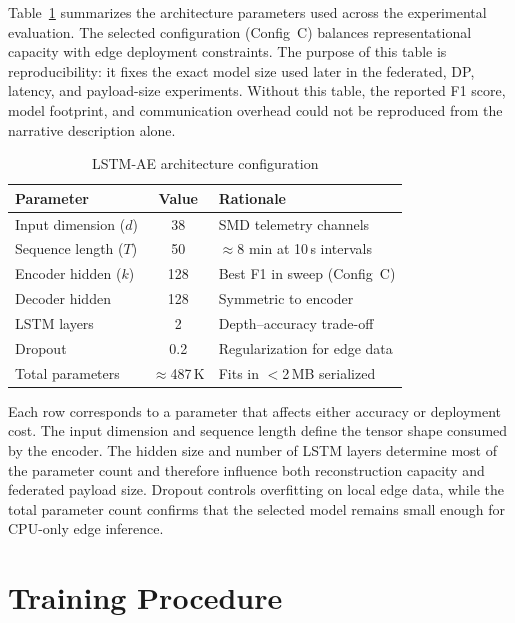 Table~\ref{tab:model_config} summarizes the architecture parameters used across
the experimental evaluation. The selected configuration (Config~C) balances
representational capacity with edge deployment constraints. The purpose of this
table is reproducibility: it fixes the exact model size used later in the
federated, DP, latency, and payload-size experiments. Without this table, the
reported F1 score, model footprint, and communication overhead could not be
reproduced from the narrative description alone.

\begin{table}[H]
    \centering
    \small
    \begin{tabular}{|l|c|l|}
        \hline
        \textbf{Parameter} & \textbf{Value} & \textbf{Rationale} \\
        \hline
        Input dimension ($d$) & 38 & SMD telemetry channels \\
        \hline
        Sequence length ($T$) & 50 & $\approx$8 min at 10\,s intervals \\
        \hline
        Encoder hidden ($k$) & 128 & Best F1 in sweep (Config~C) \\
        \hline
        Decoder hidden & 128 & Symmetric to encoder \\
        \hline
        LSTM layers & 2 & Depth--accuracy trade-off \\
        \hline
        Dropout & 0.2 & Regularization for edge data \\
        \hline
        Total parameters & $\approx$487\,K & Fits in $<$2\,MB serialized \\
        \hline
    \end{tabular}
    \caption{LSTM-AE architecture configuration}
    \label{tab:model_config}
\end{table}

Each row corresponds to a parameter that affects either accuracy or deployment
cost. The input dimension and sequence length define the tensor shape consumed
by the encoder. The hidden size and number of LSTM layers determine most of the
parameter count and therefore influence both reconstruction capacity and
federated payload size. Dropout controls overfitting on local edge data, while
the total parameter count confirms that the selected model remains small enough
for CPU-only edge inference.

\section{Training Procedure}
\label{sec:training_procedure}

